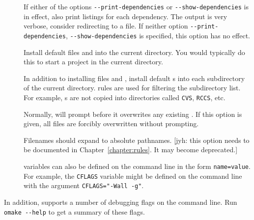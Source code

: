 \begin{description}
\item[] If either of the options \texttt{-{}-print-dependencies} or
\texttt{-{}-show-dependencies} is in effect, also print listings for each dependency.  The output is
very verbose, consider redirecting to a file.  If neither option \texttt{-{}-print-dependencies},
\texttt{-{}-show-dependencies} is specified, this option has no effect.

\item[] Install default files  and  into the current
  directory.  You would typically do this to start a project in the current directory.

\item[] In addition to installing files  and ,
  install default s into each subdirectory of the current directory.
   rules are used for filtering the subdirectory list.  For example, s
  are not copied into directories called \verb+CVS+, \verb+RCCS+, etc.

\item[] Normally,  will prompt before it overwrites any
  existing .  If this option is given, all files are forcibly overwritten
  without prompting.

\item[] Filenames should expand to absolute pathnames.  [jyh: this option needs to
be documented in Chapter~\ref{chapter:rules}.  It may become deprecated.]

\item[]  variables can also be defined on the command
  line in the form \verb+name=value+.  For example, the \verb+CFLAGS+ variable might be defined
  on the command line with the argument \verb+CFLAGS="-Wall -g"+.
\end{description}

In addition,  supports a number of debugging flags on the command line. Run
\verb+omake --help+ to get a summary of these flags.

